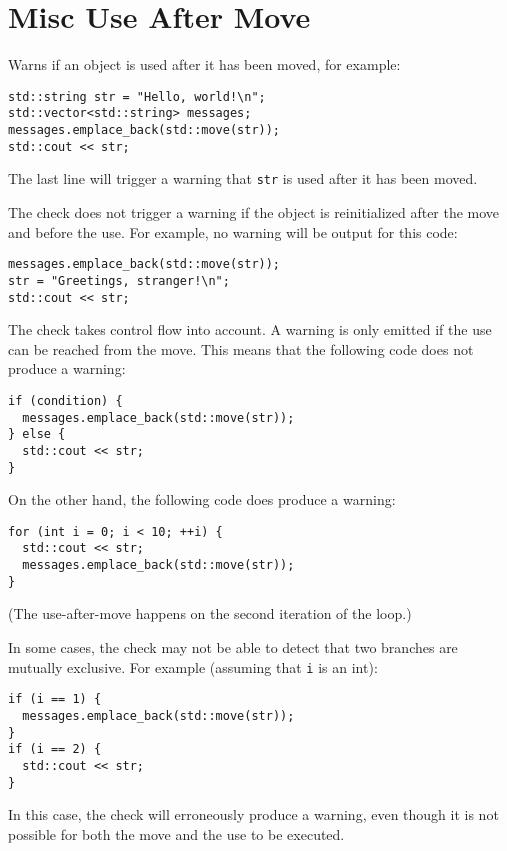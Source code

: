 
\chapter{Misc Use After Move}\label{ch:misc-use-after-move}

Warns if an object is used after it has been moved, for example:
\begin{verbatim}
std::string str = "Hello, world!\n";
std::vector<std::string> messages;
messages.emplace_back(std::move(str));
std::cout << str;
\end{verbatim}

The last line will trigger a warning that \texttt{str} is used after it has been moved.

The check does not trigger a warning if the object is reinitialized after the move and before the use. For example, no warning will be output for this code:
\begin{verbatim}
messages.emplace_back(std::move(str));
str = "Greetings, stranger!\n";
std::cout << str;
\end{verbatim}

The check takes control flow into account. A warning is only emitted if the use can be reached from the move. This means that the following code does not produce a warning:
\begin{verbatim}
if (condition) {
  messages.emplace_back(std::move(str));
} else {
  std::cout << str;
}
\end{verbatim}

On the other hand, the following code does produce a warning:
\begin{verbatim}
for (int i = 0; i < 10; ++i) {
  std::cout << str;
  messages.emplace_back(std::move(str));
}
\end{verbatim}

(The use-after-move happens on the second iteration of the loop.)

In some cases, the check may not be able to detect that two branches are mutually exclusive. For example (assuming that \texttt{i} is an int):
\begin{verbatim}
if (i == 1) {
  messages.emplace_back(std::move(str));
}
if (i == 2) {
  std::cout << str;
}
\end{verbatim}

In this case, the check will erroneously produce a warning, even though it is not possible for both the move and the use to be executed.


